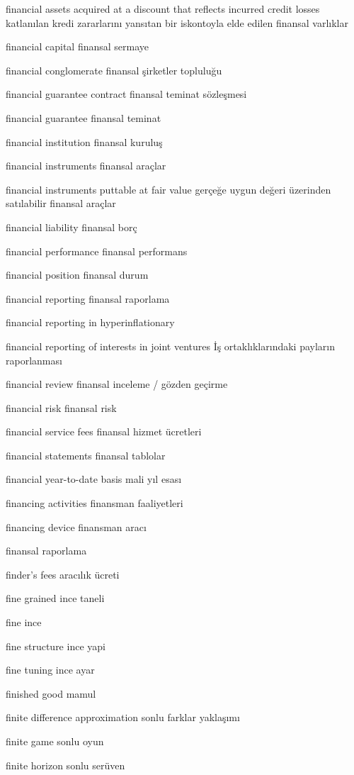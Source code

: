 \documentclass[12pt,fleqn]{article}\usepackage{../../common}
\begin{document}
financial assets acquired at a discount that reflects incurred credit losses katlanılan kredi zararlarını yansıtan bir iskontoyla elde edilen finansal varlıklar

financial capital finansal sermaye

financial conglomerate finansal şirketler topluluğu

financial guarantee contract finansal teminat sözleşmesi

financial guarantee finansal teminat

financial institution finansal kuruluş

financial instruments finansal araçlar

financial instruments puttable at fair value gerçeğe uygun değeri üzerinden satılabilir finansal araçlar

financial liability finansal borç

financial performance finansal performans

financial position finansal durum

financial reporting finansal raporlama

financial reporting in hyperinflationary

financial reporting of interests in joint ventures İş ortaklıklarındaki payların raporlanması

financial review finansal inceleme / gözden geçirme

financial risk finansal risk

financial service fees finansal hizmet ücretleri

financial statements finansal tablolar

financial year-to-date basis mali yıl esası

financing activities finansman faaliyetleri

financing device finansman aracı

finansal raporlama

finder's fees aracılık ücreti

fine grained ince taneli

fine ince

fine structure ince yapi

fine tuning ince ayar

finished good mamul

finite difference approximation sonlu farklar yaklaşımı

finite game sonlu oyun

finite horizon sonlu serüven
\end{document}
